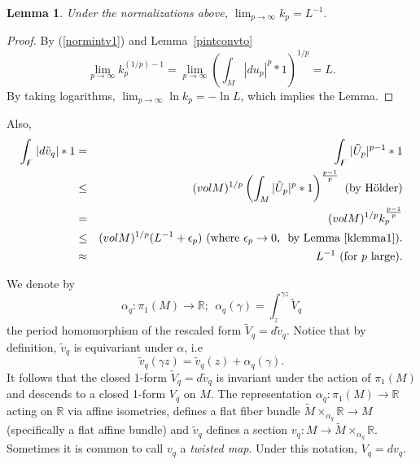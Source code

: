 \documentclass{ip-journal}
\newtheorem{lemma}[theorem]{Lemma}
\theoremstyle{definition}
\numberwithin{equation}{section}
\newcommand{\R}{\mathbb R}
\begin{document}
\begin{lemma} \label{klemma1}Under the normalizations above, 
$\lim_{p \rightarrow \infty} k_p = L^{-1}. $
\end{lemma}
 \begin{proof} 
 By (\ref{normintv1}) and Lemma~\ref{pintconvto}  
\[ 
\lim_{p \rightarrow \infty} k_p^{(1/p)-1}=\lim_{p \rightarrow \infty}  \left( \int_M |du_p|^p*1 \right )^{1/p} = L.
\]
By taking logarithms, $ \lim_{p \rightarrow \infty} \ln k_p=-\ln L$,
which implies the Lemma.
\end{proof}

Also, 
\begin{eqnarray} \label{kappanorm0}
 \int_\digamma |d\tilde v_q|*1&=& \int_\digamma | \tilde U_p|^{p-1}*1\nonumber\\
 &\leq &(vol M)^{1/p}  \left( \int_M | \tilde U_p|^p*1\right)^{\frac{p-1}{p}} \ \mbox{(by H\"older)} \\
   &= &(vol M)^{1/p} k_p^{\frac{p-1}{p}} \nonumber\\
   &\leq &(vol M)^{1/p}(L^{-1}+\epsilon_p) \ (\mbox{where $\epsilon_p \rightarrow 0$, \ by Lemma~\ref{klemma1}}).\nonumber\\
   &\approx& L^{-1} \ (\mbox{for $p$ large}).\nonumber
\end{eqnarray}

 We denote by
\[
\alpha_q: \pi_1(M) \rightarrow \R; \ \  \alpha_q(\gamma)=\int_z^{\gamma z}  \tilde V_q
\]
the period homomorphism of the rescaled form $\tilde V_q=d \tilde v_q$. Notice that by definition, $\tilde v_q$ is equivariant under $\alpha$, i.e
\[
\tilde v_q(\gamma z)=\tilde v_q(z)+\alpha_q(\gamma).
\]
It follows that the closed 1-form $\tilde V_q=d \tilde v_q$ is invariant under the action of $\pi_1(M)$ and descends to a closed 1-form $ V_q$ on $M$. 
The representation $\alpha_q: \pi_1(M) \rightarrow \R$ acting on $\R$ via affine isometries, defines a flat  fiber bundle $\tilde M \times_{\alpha_q} \R \rightarrow M$ (specifically a flat affine bundle) and $\tilde v_q$ defines a  section $v_q : M  \rightarrow \tilde M \times_{\alpha_q} \R$. Sometimes it is common to call $v_q$ a {\it{twisted map}}. Under this notation, $V_q=dv_q$.
\end{document}
